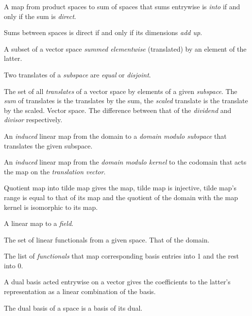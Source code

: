 \begin{multicols}{3}
  A map from product spaces to sum of spaces that sums entrywise is
  \textit{into} if and only if the sum is \textit{direct}.

  Sums between spaces is direct if and only if its dimensions \textit{add up}.

  A subset of a vector space \textit{summed elementwise} (translated) by an element of the latter.

  Two translates of a \textit{subspace} are \textit{equal} or \textit{disjoint}.

  The set of all \textit{translates} of a vector space by elements of a given \textit{subspace}.
  The \textit{sum} of translates is the translates by the sum, the \textit{scaled} translate
  is the translate by the scaled.
   Vector space.
  The difference between that of the \textit{dividend} and \textit{divisor} respectively.

  An \textit{induced} linear map from the domain to a \textit{domain modulo subspace} that
  translates the given subspace.

  An \textit{induced} linear map from the \textit{domain modulo kernel} to the codomain that
  acts the map on the \textit{translation vector}.

  Quotient map into tilde map gives the map, tilde map is injective,
  tilde map's range is equal to that of its map and
  the quotient of the domain with the map kernel is isomorphic
  to its map.


  A linear map to a \textit{field}.

  The set of linear functionals from a given space.
  That of the domain.

  The list of \textit{functionals} that map corresponding basis entries
  into 1 and the rest into 0.

  A dual basis acted entrywise on a vector gives the coefficients
  to the latter's representation as a linear combination of the basis.

  The dual basis of a space is a basis of its dual.


\end{multicols}
